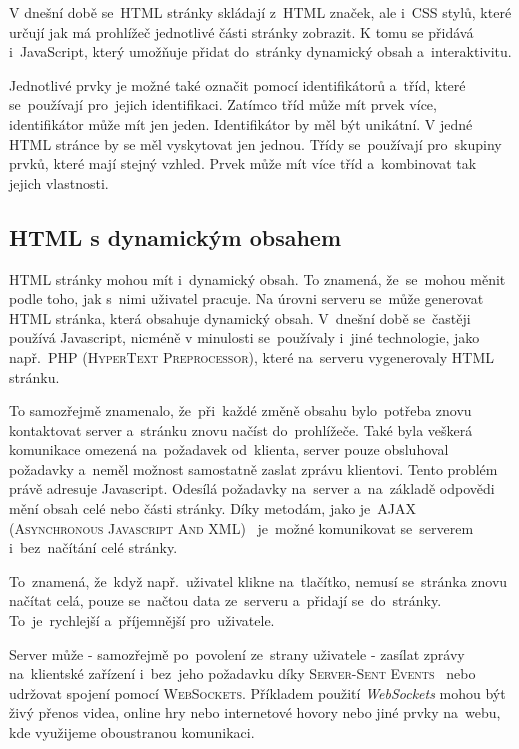 \documentclass[14pt,a4paper]{article}
\begin{document}
        V dnešní době se~HTML stránky skládají z~HTML značek, ale i~CSS stylů, které určují jak má prohlížeč jednotlivé části stránky zobrazit.
        K tomu se přidává i~JavaScript, který umožňuje přidat do~stránky dynamický obsah a~interaktivitu. \cite{berners:1989:proposal}

        Jednotlivé prvky je možné také označit pomocí identifikátorů a~tříd, které se~používají pro~jejich identifikaci.
        Zatímco tříd může mít prvek více, identifikátor může mít jen jeden. Identifikátor by měl být unikátní. V jedné HTML stránce by se měl vyskytovat jen jednou.
        Třídy se~používají pro~skupiny prvků, které mají stejný vzhled. Prvek může mít více tříd a~kombinovat tak jejich vlastnosti. \cite{jpw:tridy}

        \subsection{HTML s dynamickým obsahem}
        HTML stránky mohou mít i~dynamický obsah. To znamená, že~se~mohou měnit podle toho, jak s~nimi uživatel pracuje.
        Na úrovni serveru se~může generovat HTML stránka, která obsahuje dynamický obsah. V~dnešní době se~častěji používá Javascript,
        nicméně v minulosti se~používaly i~jiné technologie, jako např.~\textsc{PHP (HyperText Preprocessor)}, které na~serveru vygenerovaly HTML stránku.

        To samozřejmě znamenalo, že~při~každé změně obsahu bylo~potřeba znovu kontaktovat server a~stránku znovu načíst do~prohlížeče. Také byla veškerá komunikace omezená na~požadavek od~klienta, server pouze obsluhoval požadavky a~neměl možnost samostatně zaslat zprávu klientovi.
        Tento problém právě adresuje Javascript. Odesílá požadavky na~server a~na~základě odpovědi mění obsah celé nebo části stránky. Díky metodám, jako je~\textsc{AJAX (Asynchronous Javascript And XML)}~\cite{ajax:mdn} je~možné komunikovat se~serverem i~bez~načítání celé stránky.

        To~znamená, že~když např.~uživatel klikne na~tlačítko, nemusí se~stránka znovu načítat celá, pouze se~načtou data ze~serveru
        a~přidají se~do~stránky. To~je~rychlejší a~příjemnější pro~uživatele.

        Server může - samozřejmě po~povolení ze~strany uživatele - zasílat zprávy na~klientské zařízení i~bez~jeho požadavku díky \textsc{Server-Sent Events}~\cite{sse:mdn} nebo udržovat spojení pomocí \textsc{WebSockets}. Příkladem použití \emph{WebSockets} mohou být živý přenos videa, online hry nebo internetové hovory nebo jiné prvky na~webu, kde využijeme oboustranou komunikaci.~\cite{websocket:mdn}
\end{document}
